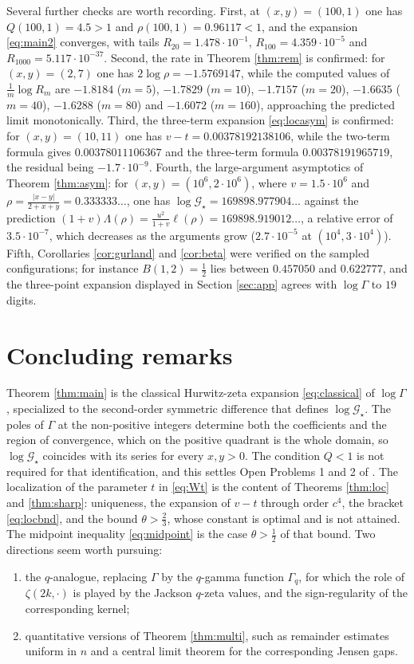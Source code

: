 \documentclass[11pt,a4paper]{amsart}
\theoremstyle{definition}
\newcommand{\Gs}{\mathcal{G}_{\star}}
\begin{document}
Several further checks are worth recording. First, at $(x,y)=(100,1)$ one has
$Q(100,1)=4.5>1$ and $\rho(100,1)=0.96117<1$, and the expansion \eqref{eq:main2} converges,
with tails $R_{20}=1.478\cdot10^{-1}$, $R_{100}=4.359\cdot10^{-5}$ and
$R_{1000}=5.117\cdot10^{-37}$. Second, the rate in Theorem \ref{thm:rem} is confirmed: for
$(x,y)=(2,7)$ one has $2\log\rho=-1.5769147$, while the computed values of
$\frac1m\log R_m$ are $-1.8184$ ($m=5$), $-1.7829$ ($m=10$), $-1.7157$ ($m=20$),
$-1.6635$ ($m=40$), $-1.6288$ ($m=80$) and $-1.6072$ ($m=160$), approaching the predicted
limit monotonically. Third, the three-term expansion \eqref{eq:locasym} is confirmed: for
$(x,y)=(10,11)$ one has $v-t=0.00378192138106$, while the two-term formula gives
$0.00378011106367$ and the three-term formula $0.00378191965719$, the residual being
$-1.7\cdot10^{-9}$. Fourth, the large-argument asymptotics of Theorem \ref{thm:asym}: for
$(x,y)=(10^{6},2\cdot10^{6})$, where $v=1.5\cdot10^{6}$ and
$\rho=\frac{|x-y|}{2+x+y}=0.333333\ldots$, one has $\log\Gs=169898.977904\ldots$ against the
prediction $(1+v)\Lambda(\rho)=\frac{u^{2}}{1+v}\ell(\rho)=169898.919012\ldots$, a relative
error of $3.5\cdot10^{-7}$, which decreases as the arguments grow ($2.7\cdot10^{-5}$ at
$(10^{4},3\cdot10^{4})$). Fifth, Corollaries \ref{cor:gurland} and \ref{cor:beta} were
verified on the sampled configurations; for instance $B(1,2)=\frac12$ lies between
$0.457050$ and $0.622777$, and the three-point expansion displayed in
Section \ref{sec:app} agrees with $\log\Gamma$ to $19$ digits.

\section{Concluding remarks}

Theorem \ref{thm:main} is the classical Hurwitz-zeta expansion \eqref{eq:classical} of
$\log\Gamma$, specialized to the second-order symmetric difference that defines
$\log\Gs$. The poles of $\Gamma$ at the non-positive integers determine both the
coefficients and the region of convergence, which on the positive quadrant is the whole
domain, so $\log\Gs$ coincides with its series for every $x,y>0$. The condition $Q<1$ is
not required for that identification, and this settles Open Problems 1 and 2 of
\cite{Wisniewska25}. The localization of the parameter $t$ in \eqref{eq:Wt} is the content
of Theorems \ref{thm:loc} and \ref{thm:sharp}: uniqueness, the expansion of $v-t$ through
order $c^{4}$, the bracket \eqref{eq:locbnd}, and the bound $\theta>\frac23$, whose
constant is optimal and is not attained. The midpoint inequality
\eqref{eq:midpoint} is the case $\theta>\frac12$ of that bound. Two directions seem worth
pursuing:
\begin{enumerate}
\item[(a)] the $q$-analogue, replacing $\Gamma$ by the $q$-gamma function $\Gamma_{q}$,
  for which the role of $\zeta(2k,\cdot)$ is played by the Jackson $q$-zeta values, and the
  sign-regularity of the corresponding kernel;
\item[(b)] quantitative versions of Theorem \ref{thm:multi}, such as remainder estimates
  uniform in $n$ and a central limit theorem for the corresponding Jensen gaps.
\end{enumerate}
\end{document}
